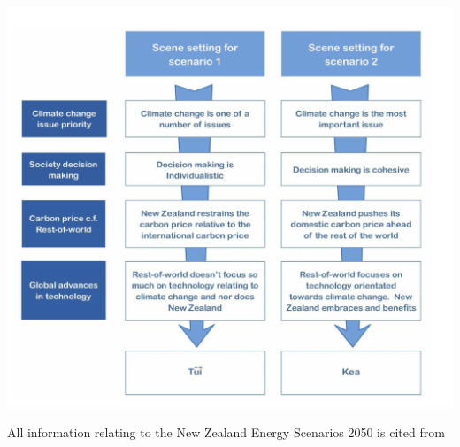 \documentclass[12pt]{article}
\begin{document}
    \begin{center}
        \includegraphics[width=\textwidth]{NZCU}
        \vspace{-1cm}
    \end{center}
    All information relating to the New Zealand Energy Scenarios 2050 is cited from \cite{TR:2}
\end{document}
